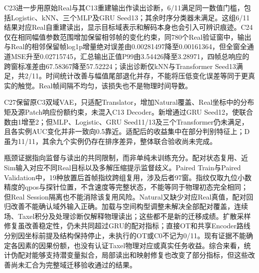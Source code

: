 C23进一步用原始Real与其C13重建输出作读出诊断，6/11满足同一数值门槛，包括Logistic、kNN、三个MLP及GRU Seed13；其余时序分类器未满足。这组6/11结果对应Real自重建读出，显示目标域表示和解码本身也会引入可辨识痕迹。C24仅在相同幅值参数范围增加保留相邻帧的变化约束，同780个Real验证窗中，输出与Real的相邻保留帧log1p增量绝对误差由0.00281497降至0.00161364，但全窗全通道MSE升至0.02715745，汇总输出正值P99由3.54426降至3.28971，四帧总响应的跨窗标准差由67.58367降至57.52224；读出诊断仅kNN与Transformer Seed13满足，共2/11。时间统计改善与幅值尾部退化并存，不能将压低变化误差等同于更真实的触觉。Real帧间隔不均匀，该损失也不是物理时间导数。

C27保留原C3双域VAE，只适配Translator，增加Natural覆盖、Real坐标中的分布矩及源Patch响应份额约束，未混入C13 Decoder。新增通过GRU Seed12，使联合数由1增至2；但MLP、Logistic、GRU Seed11/13及三个Transformer仍未满足，且各实例AUC变化并非一致向0.5靠近。适配后的收益集中在部分判别特征上；D虽为11/11，其余九个实例仍存在排序差异，整体联合验收尚未完成。

瓶颈证据指向监督与读出的共同限制，而非单纯未训练充分。配对状态复用、近Sim输入对应不同Real目标以及多解压缩提示监督歧义。Paired Train与Paired Validation中，19种放置后首帧指纹跨组复用，涉及后者97窗。指纹仅取九位小数精度的qpos与探针位置，不含速度等完整状态，不能等同于物理初态完全相同；但Real Session隔离也不能消除该复用风险。Natural又缺少对应Real真值，配对回归改善不能确认域外输入正确。加载与空间构型调整未解决全部配对覆盖，连续场、Taxel积分及处理诊断仅解释物理读出；这些都不是新的迁移成绩。扩散采样修复虽改善稳定性，仍未共同超过GRU的配对指标；直接OT和共享Encoder路线分别因坐标前提及结构保持停止，未执行的OT或C0不记为0/11。现有证据不能确定各因素的因果份额，也没有认证Taxel物理对应或真实任务收益。综合来看，统计伪配对能够支持潜变量拟合，局部读出和映射修复也改变了部分指标，但这些改善尚未汇合为完整域迁移验收通过的结果。
